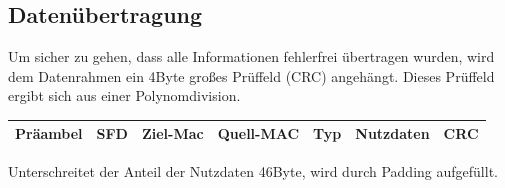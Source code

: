 \documentclass[12pt,a4paper]{article}
\begin{document}
\subsection{Datenübertragung}
    Um sicher zu gehen, dass alle Informationen fehlerfrei übertragen wurden, wird dem Datenrahmen ein 4Byte großes Prüffeld (CRC) angehängt. Dieses Prüffeld ergibt sich aus einer Polynomdivision.
    \begin{center}
        \renewcommand{\arraystretch}{1.5}
        \begin{tabularx}{17cm}{|l|l|X|X|X|X|r|}
            \hline
            Präambel&SFD&Ziel-Mac&Quell-MAC&Typ&Nutzdaten&CRC\\
            \hline
        \end{tabularx}
    \end{center}
    \newline\newline\newline
    Unterschreitet der Anteil der Nutzdaten 46Byte, wird durch Padding aufgefüllt.
\end{document}
